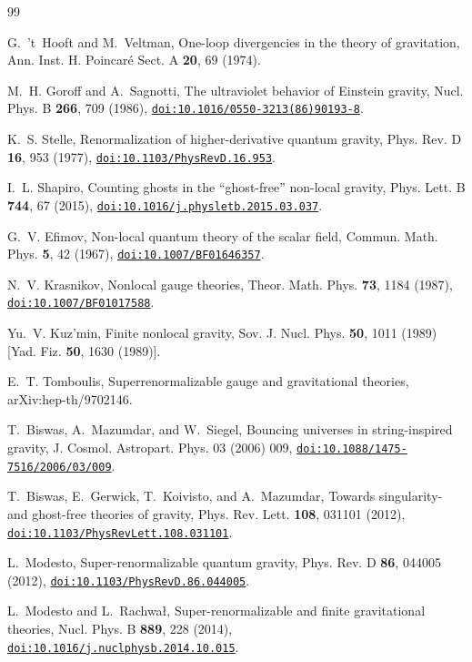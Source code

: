 \documentclass[aps,prd,10pt,twocolumn,superscriptaddress,nofootinbib,floatfix,longbibliography]{revtex4-2}
\newcommand{\doilink}[1]{\href{https://doi.org/#1}{\nolinkurl{doi:#1}}}
\begin{document}
\begin{thebibliography}{99}

G.~'t~Hooft and M.~Veltman, One-loop divergencies in the theory of gravitation, Ann. Inst. H. Poincar\'e Sect. A \textbf{20}, 69 (1974).

M.~H. Goroff and A.~Sagnotti, The ultraviolet behavior of Einstein gravity, Nucl. Phys. B \textbf{266}, 709 (1986), \doilink{10.1016/0550-3213(86)90193-8}.

K.~S. Stelle, Renormalization of higher-derivative quantum gravity, Phys. Rev. D \textbf{16}, 953 (1977), \doilink{10.1103/PhysRevD.16.953}.

I.~L. Shapiro, Counting ghosts in the ``ghost-free'' non-local gravity, Phys. Lett. B \textbf{744}, 67 (2015), \doilink{10.1016/j.physletb.2015.03.037}.

G.~V. Efimov, Non-local quantum theory of the scalar field, Commun. Math. Phys. \textbf{5}, 42 (1967), \doilink{10.1007/BF01646357}.

N.~V. Krasnikov, Nonlocal gauge theories, Theor. Math. Phys. \textbf{73}, 1184 (1987), \doilink{10.1007/BF01017588}.

Yu.~V. Kuz'min, Finite nonlocal gravity, Sov. J. Nucl. Phys. \textbf{50}, 1011 (1989) [Yad. Fiz. \textbf{50}, 1630 (1989)].

E.~T. Tomboulis, Superrenormalizable gauge and gravitational theories, arXiv:hep-th/9702146.

T.~Biswas, A.~Mazumdar, and W.~Siegel, Bouncing universes in string-inspired gravity, J. Cosmol. Astropart. Phys. 03 (2006) 009, \doilink{10.1088/1475-7516/2006/03/009}.

T.~Biswas, E.~Gerwick, T.~Koivisto, and A.~Mazumdar, Towards singularity- and ghost-free theories of gravity, Phys. Rev. Lett. \textbf{108}, 031101 (2012), \doilink{10.1103/PhysRevLett.108.031101}.

L.~Modesto, Super-renormalizable quantum gravity, Phys. Rev. D \textbf{86}, 044005 (2012), \doilink{10.1103/PhysRevD.86.044005}.

L.~Modesto and L.~Rachwa{\l}, Super-renormalizable and finite gravitational theories, Nucl. Phys. B \textbf{889}, 228 (2014), \doilink{10.1016/j.nuclphysb.2014.10.015}.


\end{thebibliography}
\end{document}
